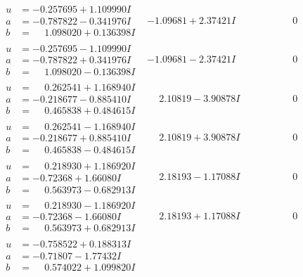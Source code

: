 \documentclass[1p]{elsarticle_modified}
\theoremstyle{definition}
\begin{document}
$$\begin{array}{c|c|c}
\begin{aligned}
u &= -0.257695 + 1.109990 I \\
a &= -0.787822 - 0.341976 I \\
b &= \phantom{-}1.098020 + 0.136398 I\end{aligned}
 & -1.09681 + 2.37421 I & \phantom{-0.000000 } 0 \\ \hline\begin{aligned}
u &= -0.257695 - 1.109990 I \\
a &= -0.787822 + 0.341976 I \\
b &= \phantom{-}1.098020 - 0.136398 I\end{aligned}
 & -1.09681 - 2.37421 I & \phantom{-0.000000 } 0 \\ \hline\begin{aligned}
u &= \phantom{-}0.262541 + 1.168940 I \\
a &= -0.218677 - 0.885410 I \\
b &= \phantom{-}0.465838 + 0.484615 I\end{aligned}
 & \phantom{-}2.10819 - 3.90878 I & \phantom{-0.000000 } 0 \\ \hline\begin{aligned}
u &= \phantom{-}0.262541 - 1.168940 I \\
a &= -0.218677 + 0.885410 I \\
b &= \phantom{-}0.465838 - 0.484615 I\end{aligned}
 & \phantom{-}2.10819 + 3.90878 I & \phantom{-0.000000 } 0 \\ \hline\begin{aligned}
u &= \phantom{-}0.218930 + 1.186920 I \\
a &= -0.72368 + 1.66080 I \\
b &= \phantom{-}0.563973 - 0.682913 I\end{aligned}
 & \phantom{-}2.18193 - 1.17088 I & \phantom{-0.000000 } 0 \\ \hline\begin{aligned}
u &= \phantom{-}0.218930 - 1.186920 I \\
a &= -0.72368 - 1.66080 I \\
b &= \phantom{-}0.563973 + 0.682913 I\end{aligned}
 & \phantom{-}2.18193 + 1.17088 I & \phantom{-0.000000 } 0 \\ \hline\begin{aligned}
u &= -0.758522 + 0.188313 I \\
a &= -0.71807 - 1.77432 I \\
b &= \phantom{-}0.574022 + 1.099820 I\end{aligned}

\end{array}$$
\end{document}
